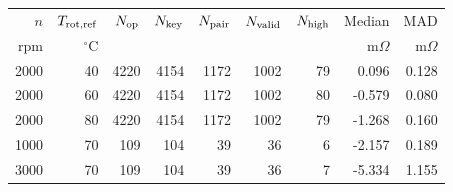 \begin{tabular}{@{}rrrrrrrrr@{}}
\toprule
$n$ & $T_{\rm rot,ref}$ & $N_{\rm op}$ & $N_{\rm key}$ & $N_{\rm pair}$ & $N_{\rm valid}$ & $N_{\rm high}$ & Median & MAD\\
rpm & $^\circ$C & & & & & & m$\Omega$ & m$\Omega$\\
\midrule
2000 & 40 & 4220 & 4154 & 1172 & 1002 & 79 & 0.096 & 0.128 \\
2000 & 60 & 4220 & 4154 & 1172 & 1002 & 80 & -0.579 & 0.080 \\
2000 & 80 & 4220 & 4154 & 1172 & 1002 & 79 & -1.268 & 0.160 \\
\midrule
1000 & 70 & 109 & 104 & 39 & 36 & 6 & -2.157 & 0.189 \\
3000 & 70 & 109 & 104 & 39 & 36 & 7 & -5.334 & 1.155 \\
\bottomrule
\end{tabular}
